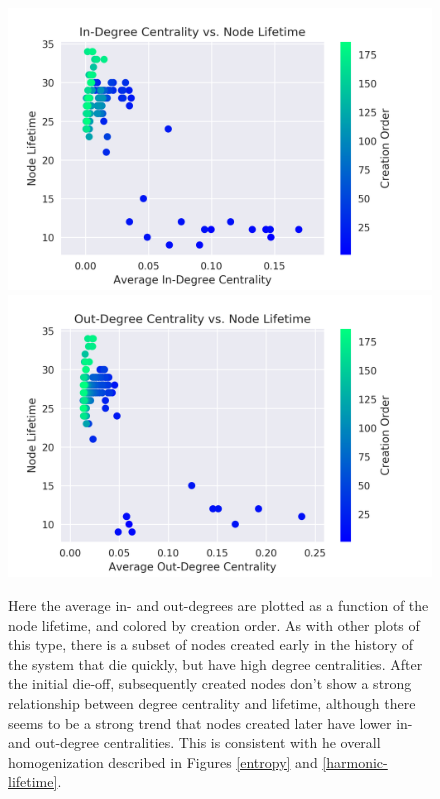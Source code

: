 \documentclass{paper}
\begin{document}
	\begin{figure}[h]
		\centering
		\includegraphics[scale=0.75]{in_degree_lifetimes.png}
		\includegraphics[scale=0.75]{out_degree_lifetimes.png}
		\caption{Here the average in- and out-degrees are plotted as a function of the node lifetime, and colored by creation order. As with other plots of this type, there is a subset of nodes created early in the history of the system that die quickly, but have high degree centralities. After the initial die-off, subsequently created nodes don't show a strong relationship between degree centrality and lifetime, although there seems to be a strong trend that nodes created later have lower in- and out-degree centralities. This is consistent with he overall homogenization described in Figures \ref{entropy} and \ref{harmonic-lifetime}.} 
		\label{degree-lifetime}
	\end{figure}
	
\end{document}
